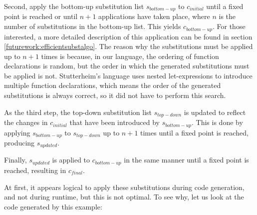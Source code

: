 \documentclass[10pt]{report}
\begin{document}
{Second, apply the bottom-up substitution list $s_{bottom-up}$ to $c_{initial}$ until a fixed point is reached or until $n+1$ applications have taken place, where $n$ is the number of substitutions in the bottom-up list. 
This yields $c_{bottom-up}$.
For those interested, a more detailed description of this application can be found in section \ref{futurework:efficientsubstalgo}.
The reason why the substitutions must be applied up to $n+1$ times is because, in our language, the ordering of function declarations is random, but the order in which the generated substitutions must be applied is not.
Stutterheim's language uses nested let-expressions to introduce multiple function declarations, which means the order of the generated substitutions is always correct, so it did not have to perform this search.

As the third step, the top-down substitution list $s_{top-down}$ is updated to reflect the changes in $c_{initial}$ that have been introduced by $s_{bottom-up}$.
This is done by applying $s_{bottom-up}$ to $s_{top-down}$ up to $n+1$ times until a fixed point is reached, producing $s_{updated}$.

Finally, $s_{updated}$ is applied to $c_{bottom-up}$ in the same manner until a fixed point is reached, resulting in $c_{final}$.



%

At first, it appears logical to apply these substitutions during code generation, and not during runtime, but this is not optimal.
To see why, let us look at the code generated by this example:

}
\end{document}
